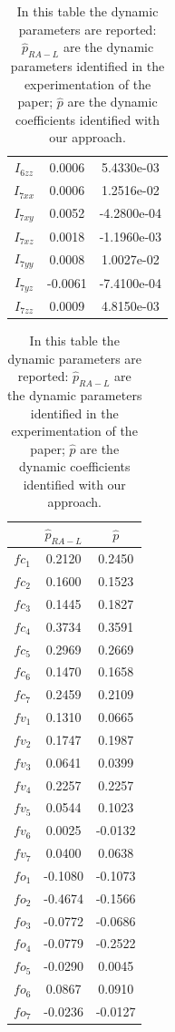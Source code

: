 \documentclass{article}
\begin{document}
\begin{table}
\begin{center}
\begin{tabular}{|c|cc|}
$ I_{6zz} $ & 0.0006 & 5.4330e-03\\
$ I_{7xx} $ & 0.0006 & 1.2516e-02\\
$ I_{7xy} $ & 0.0052 & -4.2800e-04\\
$ I_{7xz} $ & 0.0018 & -1.1960e-03\\
$ I_{7yy} $ & 0.0008 & 1.0027e-02\\
$ I_{7yz} $ & -0.0061 & -7.4100e-04\\
$ I_{7zz} $ & 0.0009 & 4.8150e-03\\
\hline
\end{tabular}
\hspace{1cm}
\begin{tabular}{|c|cc|}
\hline
& $\hat{p}_{RA-L}$ & $\hat{p}$\\ 
\hline
$ fc_1 $ & 0.2120 & 0.2450\\
$ fc_2 $ & 0.1600 & 0.1523\\
$ fc_3 $ & 0.1445 & 0.1827\\
$ fc_4 $ & 0.3734 & 0.3591\\
$ fc_5 $ & 0.2969 & 0.2669\\
$ fc_6 $ & 0.1470 & 0.1658\\
$ fc_7 $ & 0.2459 & 0.2109\\
$ fv_1 $ & 0.1310 & 0.0665\\
$ fv_2 $ & 0.1747 & 0.1987\\
$ fv_3 $ & 0.0641 & 0.0399\\
$ fv_4 $ & 0.2257 & 0.2257\\
$ fv_5 $ & 0.0544 & 0.1023\\
$ fv_6 $ & 0.0025 & -0.0132\\
$ fv_7 $ & 0.0400 & 0.0638\\
$ fo_1 $ & -0.1080 & -0.1073\\
$ fo_2 $ & -0.4674 & -0.1566\\
$ fo_3 $ & -0.0772 & -0.0686\\
$ fo_4 $ & -0.0779 & -0.2522\\
$ fo_5 $ & -0.0290 & 0.0045\\
$ fo_6 $ & 0.0867 & 0.0910\\
$ fo_7 $ & -0.0236 & -0.0127\\
\hline
\end{tabular}
\end{center}
\caption{In this table the dynamic parameters are reported: $\hat{p}_{RA-L}$ are the dynamic parameters identified in the experimentation of the paper; $\hat{p}$ are the dynamic coefficients identified with our approach.}
\end{table}
\end{document}
